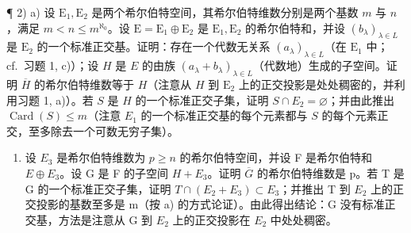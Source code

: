 ¶ 2) a) 设 \(\mathrm{E}_1, \mathrm{E}_2\) 是两个希尔伯特空间，其希尔伯特维数分别是两个基数 \(m\) 与 \(n\)，满足 \(m < n \leqslant m^{\aleph_{0}}\)。设 \(\mathrm{E} = \mathrm{E}_1 \oplus \mathrm{E}_2\) 是 \(\mathrm{E}_1, \mathrm{E}_2\) 的希尔伯特和，并设 \((b_\lambda)_{\lambda \in L}\) 是 \(\mathrm{E}_2\) 的一个标准正交基。证明：存在一个代数无关系 \((a_\lambda)_{\lambda \in L}\)（在 \(\mathrm{E}_1\) 中；cf.~习题 1, c)）；设 \(H\) 是 \(E\) 的由族 \((a_\lambda + b_\lambda)_{\lambda \in L}\)（代数地）生成的子空间。证明 \(\overline{H}\) 的希尔伯特维数等于 \(H\)（注意从 \(H\) 到 \(\mathrm{E}_2\) 上的正交投影是处处稠密的，并利用习题 1, a)）。若 \(S\) 是 \(H\) 的一个标准正交子集，证明 \(S \cap E_2 = \varnothing\)；并由此推出 \(\operatorname{Card}(S) \leqslant m\)（注意 \(E_1\) 的一个标准正交基的每个元素都与 \(S\) 的每个元素正交，至多除去一个可数无穷子集）。

\begin{enumerate}
\def\labelenumi{\alph{enumi})}
\setcounter{enumi}{1}
\tightlist
\item
  设 \(E_{3}\) 是希尔伯特维数为 \(p \geqslant n\) 的希尔伯特空间，并设 F 是希尔伯特和 \(E \oplus E_{3}\)。设 G 是 F 的子空间 \(H + E_{3}\)。证明 \(\overline{G}\) 的希尔伯特维数是 p。若 T 是 G 的一个标准正交子集，证明 \(T \cap (E_{2} + E_{3}) \subset E_{3}\)；并推出 T 到 \(E_{2}\) 上的正交投影的基数至多是 m（按 a) 的方式论证）。由此得出结论：G 没有标准正交基，方法是注意从 G 到 \(E_{2}\) 上的正交投影在 \(E_{2}\) 中处处稠密。
\end{enumerate}


